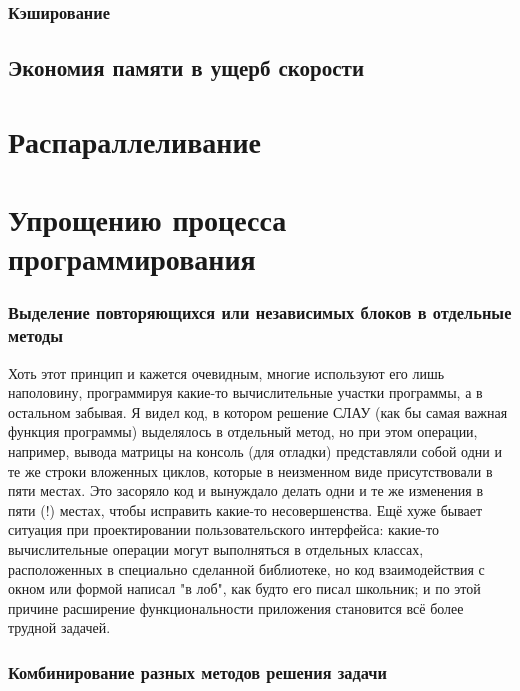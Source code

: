 \documentclass[a4paper, 12pt]{article}
\begin{document}
\subsubsection{Кэширование}

\subsection{Экономия памяти в ущерб скорости}

\section{Распараллеливание}

\section{Упрощению процесса программирования}

\subsubsection{Выделение повторяющихся или независимых блоков в отдельные методы}
Хоть этот принцип и кажется очевидным, многие используют его лишь наполовину, программируя какие-то вычислительные участки программы, а в остальном забывая.
Я видел код, в котором решение СЛАУ (как бы самая важная функция программы) выделялось в отдельный метод, но при этом операции, например, вывода матрицы на консоль (для отладки) представляли собой одни и те же строки
вложенных циклов, которые в неизменном виде присутствовали в пяти местах.
Это засоряло код и вынуждало делать одни и те же изменения в пяти (!) местах, чтобы исправить какие-то несовершенства.
Ещё хуже бывает ситуация при проектировании пользовательского интерфейса: какие-то вычислительные операции могут выполняться в отдельных классах, расположенных в специально сделанной библиотеке, но код взаимодействия с окном или формой написал "в лоб", как будто его писал школьник;
и по этой причине расширение функциональности приложения становится всё более трудной задачей.

\subsubsection{Комбинирование разных методов решения задачи}
\end{document}
